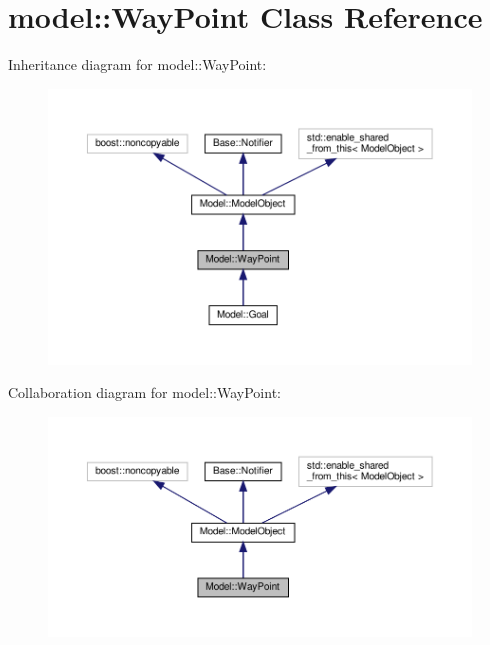 \hypertarget{class_model_1_1_way_point}{}\section{model\+:\+:Way\+Point Class Reference}
\label{class_model_1_1_way_point}


Inheritance diagram for model\+:\+:Way\+Point\+:
\nopagebreak
\begin{figure}[H]
\begin{center}
\leavevmode
\includegraphics[width=350pt]{class_model_1_1_way_point__inherit__graph}
\end{center}
\end{figure}


Collaboration diagram for model\+:\+:Way\+Point\+:
\nopagebreak
\begin{figure}[H]
\begin{center}
\leavevmode
\includegraphics[width=350pt]{class_model_1_1_way_point__coll__graph}
\end{center}
\end{figure}
